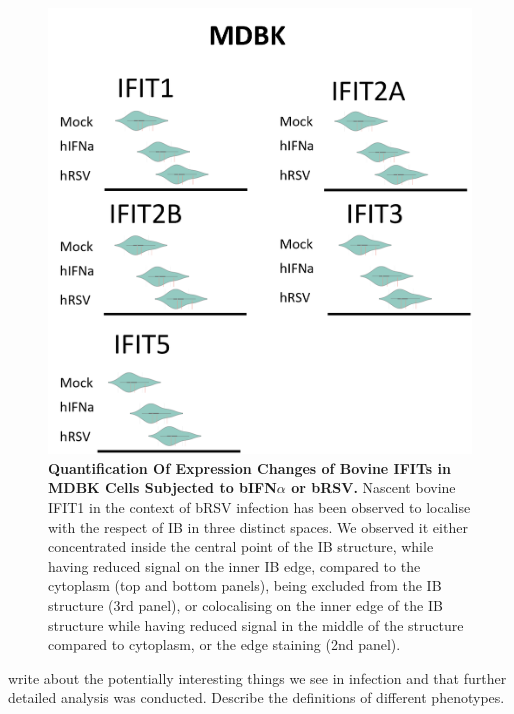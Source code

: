 \begin{figure}
    \centering
    \includegraphics[width=1\linewidth]{09. Chapter 4/Figs/01. Localisation introduction/09. mdbk plots.png}
    \caption[Quantification Of Expression Changes of Bovine IFITs in MDBK Cells Subjected to bIFN\(\alpha\) or bRSV.]{\textbf{Quantification Of Expression Changes of Bovine IFITs in MDBK Cells Subjected to bIFN\(\alpha\) or bRSV.} Nascent bovine IFIT1 in the context of bRSV infection has been observed to localise with the respect of IB in three distinct spaces. We observed it either concentrated inside the central point of the IB structure, while having reduced signal on the inner IB edge, compared to the cytoplasm (top and bottom panels), being excluded from the IB structure (3rd panel), or colocalising on the inner edge of the IB structure while having reduced signal in the middle of the structure compared to cytoplasm, or the edge staining (2nd panel).}
    \label{fig:Quantification Of Expression Changes of Bovine IFITs in MDBK Cells Subjected to bIFNa or bRSV}
\end{figure}

write about the potentially interesting things we see in infection and that further detailed analysis was conducted. Describe the definitions of different phenotypes. 